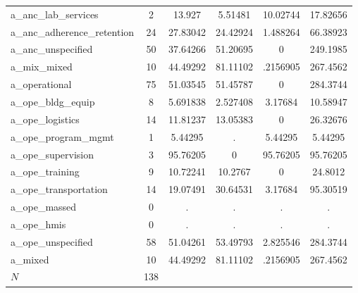 \begin{table}[htbp]
\begin{tabular}{l*{1}{ccccc}}
a\_anc\_lab\_services&           2&      13.927&     5.51481&    10.02744&    17.82656\\
a\_anc\_adherence\_retention&          24&    27.83042&    24.42924&    1.488264&    66.38923\\
a\_anc\_unspecified&          50&    37.64266&    51.20695&           0&    249.1985\\
a\_mix\_mixed &          10&    44.49292&    81.11102&    .2156905&    267.4562\\
a\_operational&          75&    51.03545&    51.45787&           0&    284.3744\\
a\_ope\_bldg\_equip&           8&    5.691838&    2.527408&     3.17684&    10.58947\\
a\_ope\_logistics&          14&    11.81237&    13.05383&           0&    26.32676\\
a\_ope\_program\_mgmt&           1&     5.44295&           .&     5.44295&     5.44295\\
a\_ope\_supervision&           3&    95.76205&           0&    95.76205&    95.76205\\
a\_ope\_training&           9&    10.72241&     10.2767&           0&     24.8012\\
a\_ope\_transportation&          14&    19.07491&    30.64531&     3.17684&    95.30519\\
a\_ope\_massed&           0&           .&           .&           .&           .\\
a\_ope\_hmis  &           0&           .&           .&           .&           .\\
a\_ope\_unspecified&          58&    51.04261&    53.49793&    2.825546&    284.3744\\
a\_mixed     &          10&    44.49292&    81.11102&    .2156905&    267.4562\\
\hline
\(N\)       &         138&            &            &            &            \\
\hline\hline
\end{tabular}
\end{table}
